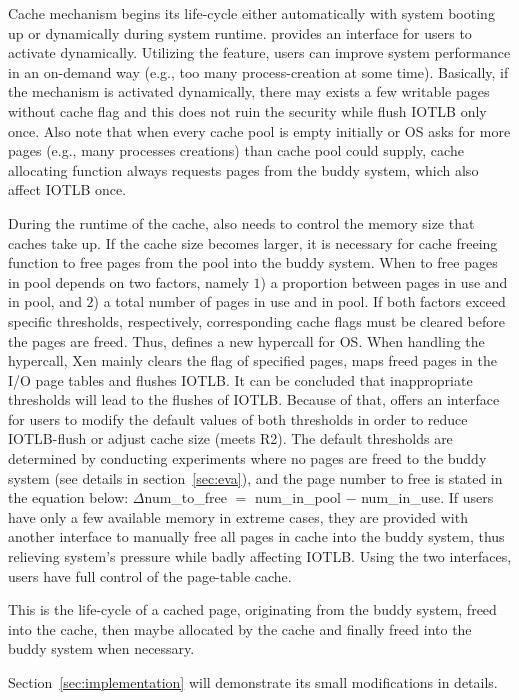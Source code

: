 Cache mechanism begins its life-cycle either automatically with system booting up or dynamically during system runtime. \name provides an interface for users to activate dynamically. Utilizing the feature, users can improve system performance in an on-demand way (e.g., too many process-creation at some time). Basically, if the mechanism is activated dynamically, there may exists a few writable pages without cache flag and this does not ruin the security while flush IOTLB only once. Also note that when every cache pool is empty initially or OS asks for more pages (e.g., many processes creations) than cache pool could supply, cache allocating function always requests pages from the buddy system, which also affect IOTLB once.

During the runtime of the cache, \name also needs to control the memory size that caches take up. If the cache size becomes larger, it is necessary for cache freeing function to free pages from the pool into the buddy system. When to free pages in pool depends on two factors, namely $1$) a proportion between pages in use and in pool, and $2$) a total number of pages in use and in pool. If both factors exceed specific thresholds, respectively, corresponding cache flags must be cleared before the pages are freed. Thus, \name defines a new hypercall for OS. When handling the hypercall, Xen mainly clears the flag of specified pages, maps freed pages in the I/O page tables and flushes IOTLB. It can be concluded that inappropriate thresholds will lead to the flushes of IOTLB. Because of that, \name offers an interface for users to modify the default values of both thresholds in order to reduce IOTLB-flush or adjust cache size (meets R2). The default thresholds are determined by conducting experiments where no pages are freed to the buddy system (see details in section~\ref{sec:eva}), and the page number to free is stated in the equation below: $\Delta$num\_to\_free $=$ num\_in\_pool $-$ num\_in\_use. If users have only a few available memory in extreme cases, they are provided with another interface to manually free all pages in cache into the buddy system, thus relieving system's pressure while badly affecting IOTLB. Using the two interfaces, users have full control of the page-table cache.

This is the life-cycle of a cached page, originating from the buddy system, freed into the cache, then maybe allocated by the cache and finally freed into the buddy system when necessary.

Section~\ref{sec:implementation} will demonstrate its small modifications in details.
